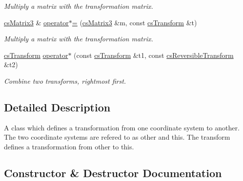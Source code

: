 \begin{DoxyCompactItemize}
\begin{DoxyCompactList}\small\item\em Multiply a matrix with the transformation matrix. \end{DoxyCompactList}\item 
\hyperlink{classcsMatrix3}{cs\+Matrix3} \& \hyperlink{classcsTransform_a7cb1bd7b0a38eaf3f6beee7c08c60d24}{operator$\ast$=} (\hyperlink{classcsMatrix3}{cs\+Matrix3} \&m, const \hyperlink{classcsTransform}{cs\+Transform} \&t)\hypertarget{classcsTransform_a7cb1bd7b0a38eaf3f6beee7c08c60d24}{}\label{classcsTransform_a7cb1bd7b0a38eaf3f6beee7c08c60d24}

\begin{DoxyCompactList}\small\item\em Multiply a matrix with the transformation matrix. \end{DoxyCompactList}\item 
\hyperlink{classcsTransform}{cs\+Transform} \hyperlink{classcsTransform_a176327eefeb5555004a1fdd03478b836}{operator$\ast$} (const \hyperlink{classcsTransform}{cs\+Transform} \&t1, const \hyperlink{classcsReversibleTransform}{cs\+Reversible\+Transform} \&t2)\hypertarget{classcsTransform_a176327eefeb5555004a1fdd03478b836}{}\label{classcsTransform_a176327eefeb5555004a1fdd03478b836}

\begin{DoxyCompactList}\small\item\em Combine two transforms, rightmost first. \end{DoxyCompactList}\end{DoxyCompactItemize}


\subsection{Detailed Description}
A class which defines a transformation from one coordinate system to another. The two coordinate systems are refered to as \textquotesingle{}other\textquotesingle{} and \textquotesingle{}this\textquotesingle{}. The transform defines a transformation from \textquotesingle{}other\textquotesingle{} to \textquotesingle{}this\textquotesingle{}. 

\subsection{Constructor \& Destructor Documentation}
